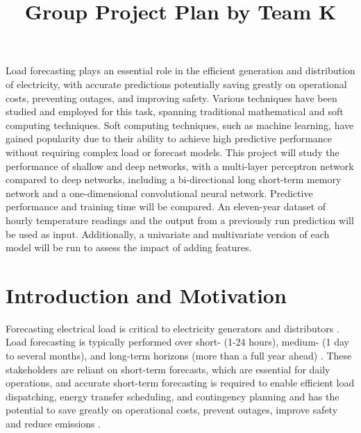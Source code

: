 \documentclass[mstat,12pt]{unswthesis}
\title{Group Project Plan by Team K\\[0.5cm]}
\author{\Authornameonly}
\begin{document}
\beforepreface


Load forecasting plays an essential role in the efficient generation and distribution of electricity, with accurate predictions potentially saving greatly on operational costs, preventing outages, and improving safety. Various techniques have been studied and employed for this task, spanning traditional mathematical and soft computing techniques. Soft computing techniques, such as machine learning, have gained popularity due to their ability to achieve high predictive performance without requiring complex load or forecast models. This project will study the performance of shallow and deep networks, with a multi-layer perceptron network compared to deep networks, including a bi-directional long short-term memory network and a one-dimensional convolutional neural network. Predictive performance and training time will be compared. An eleven-year dataset of hourly temperature readings and the output from a previously run prediction will be used as input. Additionally, a univariate and multivariate version of each model will be run to assess the impact of adding features.

\afterpreface


%
%





\renewcommand*\thesection{\arabic{section}} %

\hypertarget{introduction-and-motivation}{
    \section{Introduction and Motivation}
    \label{introduction-and-motivation}
}

Forecasting electrical load is critical to electricity generators and distributors \cite{Djukanovic1995}\cite{Berk2018}. Load forecasting is typically performed over short- (1-24 hours), medium- (1 day to several months), and long-term horizons (more than a full year ahead) \cite{Yalcinoz2005}. These stakeholders are reliant on short-term forecasts, which are essential for daily operations, and accurate short-term forecasting is required to enable efficient load dispatching, energy transfer scheduling, and contingency planning and has the potential to save greatly on operational costs, prevent outages, improve safety and reduce emissions \cite{KavousiFard2014}\cite{Dong2021}.\newline
\end{document}
